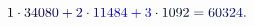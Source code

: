 \documentclass[12pt]{article}
\begin{document}
\makeatletter
\renewcommand*{\@textcolor}[3]{%
  \protect\leavevmode
  \begingroup
    \color#1{#2}#3%
  \endgroup
}
\makeatother
\begin{displaymath}
\mathcolor[RGB]{0,0,15}{1} \mathcolor[RGB]{0,0,30}{\cdot} \mathcolor[RGB]{0,0,45}{3} \mathcolor[RGB]{0,0,60}{4} \mathcolor[RGB]{0,0,75}{0} \mathcolor[RGB]{0,0,90}{8} \mathcolor[RGB]{0,0,105}{0} \mathcolor[RGB]{0,0,120}{+} \mathcolor[RGB]{0,0,135}{2} \mathcolor[RGB]{0,0,150}{\cdot} \mathcolor[RGB]{0,0,165}{1} \mathcolor[RGB]{0,0,180}{1} \mathcolor[RGB]{0,0,195}{4} \mathcolor[RGB]{0,0,210}{8} \mathcolor[RGB]{0,0,225}{4} \mathcolor[RGB]{0,0,240}{+} \mathcolor[RGB]{0,0,255}{3} \mathcolor[RGB]{0,15,0}{\cdot} \mathcolor[RGB]{0,15,15}{1} \mathcolor[RGB]{0,15,30}{0} \mathcolor[RGB]{0,15,45}{9} \mathcolor[RGB]{0,15,60}{2} \mathcolor[RGB]{0,15,75}{=} \mathcolor[RGB]{0,15,90}{6} \mathcolor[RGB]{0,15,105}{0} \mathcolor[RGB]{0,15,120}{3} \mathcolor[RGB]{0,15,135}{2} \mathcolor[RGB]{0,15,150}{4} \mathcolor[RGB]{0,15,165}{.}
\end{displaymath}
\end{document}
